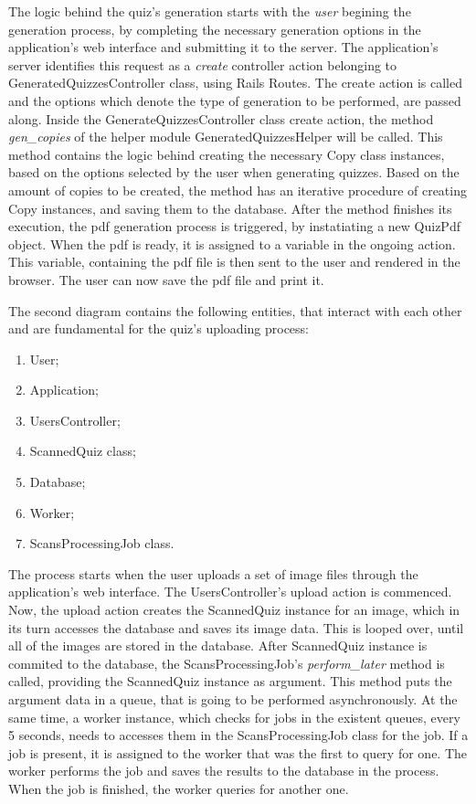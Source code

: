 The logic behind the quiz's generation starts with the \textit{user} begining the generation process, by completing the necessary generation options in the application's web interface and submitting it to the server. The application's server identifies this request as a \textit{create} controller action belonging to GeneratedQuizzesController class, using Rails Routes. The create action is called and the options which denote the type of generation to be performed, are passed along. Inside the GenerateQuizzesController class create action, the method \textit{gen\_copies} of the helper module GeneratedQuizzesHelper will be called. This method contains the logic behind creating the necessary Copy class instances, based on the options selected by the user when generating quizzes. Based on the amount of copies to be created, the method has an iterative procedure of creating Copy instances, and saving them to the database. After the method finishes its execution, the pdf generation process is triggered, by instatiating a new QuizPdf object. When the pdf is ready, it is assigned to a variable in the ongoing action. This variable, containing the pdf file is then sent to the user and rendered in the browser. The user can now save the pdf file and print it.

The second diagram contains the following entities, that interact with each other and are fundamental for the quiz's uploading process:
\begin{enumerate}
  \item User;
  \item Application;
  \item UsersController;
  \item ScannedQuiz class;
  \item Database;
  \item Worker;
  \item ScansProcessingJob class.
\end{enumerate}

The process starts when the user uploads a set of image files through the application's web interface. The UsersController's upload action is commenced. Now, the upload action creates the ScannedQuiz instance for an image, which in its turn accesses the database and saves its image data. This is looped over, until all of the images are stored in the database. After ScannedQuiz instance is commited to the database, the ScansProcessingJob's \textit{perform\_later} method is called, providing the ScannedQuiz instance as argument. This method puts the argument data in a queue, that is going to be performed asynchronously. At the same time, a worker instance, which checks for jobs in the existent queues, every 5 seconds, needs to accesses them in the ScansProcessingJob class for the job. If a job is present, it is assigned to the worker that was the first to query for one. The worker performs the job and saves the results to the database in the process. When the job is finished, the worker queries for another one.


